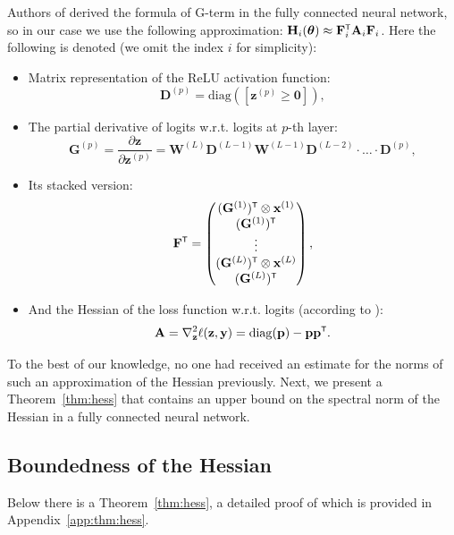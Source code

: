 \documentclass{article}
\begin{document}
Authors of \cite{wu2022dissecting} derived the formula of G-term in the fully connected neural network, so in our case we use the following approximation: $\mathbf{H}_{i}(\boldsymbol{\theta}) \approx \mathbf{F}_i\T \mathbf{A}_i \mathbf{F}_i$. Here the following is denoted (we omit the index $i$ for simplicity):
\begin{itemize}
    \item Matrix representation of the ReLU activation function:
    \[ \mathbf{D}^{(p)} = \mathrm{diag}([\mathbf{z}^{(p)} \geqslant \mathbf{0}]), \]
    \item The partial derivative of logits w.r.t. logits at $p$-th layer:
    \[ \mathbf{G}^{(p)} = \dfrac{\partial \mathbf{z}}{\partial \mathbf{z}^{(p)}} = \mathbf{W}^{(L)} \mathbf{D}^{(L-1)} \mathbf{W}^{(L-1)} \mathbf{D}^{(L-2)} \cdot \ldots \cdot \mathbf{D}^{(p)}, \]
    \item Its stacked version:
    \[ \mathbf{F}\T = \begin{pmatrix}
        (\mathbf{G}^{(1)})\T \otimes \mathbf{x}^{(1)} \\
        (\mathbf{G}^{(1)})\T \\ 
        \vdots \\
        (\mathbf{G}^{(L)})\T \otimes \mathbf{x}^{(L)} \\
        (\mathbf{G}^{(L)})\T \\ 
    \end{pmatrix}, \]
    \item And the Hessian of the loss function w.r.t. logits (according to \cite{singla2019understanding}):
    \[ \mathbf{A} = \nabla^2_\mathbf{z} \ell(\mathbf{z}, \mathbf{y}) = \mathrm{diag}(\mathbf{p}) - \mathbf{p} \mathbf{p}\T. \]
\end{itemize}

To the best of our knowledge, no one had received an estimate for the norms of such an approximation of the Hessian previously. Next, we present a Theorem~\ref{thm:hess} that contains an upper bound on the spectral norm of the Hessian in a fully connected neural network.

\subsection{Boundedness of the Hessian}

Below there is a Theorem~\ref{thm:hess}, a detailed proof of which is provided in Appendix~\ref{app:thm:hess}. 
\end{document}

